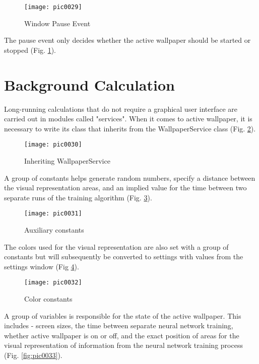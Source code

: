 \begin{figure}[h]
\centering
\texttt{[image: pic0029]}
\caption{Window Pause Event}
\label{fig:pic0029}
\end{figure}
\FloatBarrier

The pause event only decides whether the active wallpaper should be started or stopped (Fig. \ref{fig:pic0029}).

\section{Background Calculation}

Long-running calculations that do not require a graphical user interface are carried out in modules called "services". When it comes to active wallpaper, it is necessary to write its class that inherits from the WallpaperService class (Fig. \ref{fig:pic0030}).

\begin{figure}[h]
\centering
\texttt{[image: pic0030]}
\caption{Inheriting WallpaperService}
\label{fig:pic0030}
\end{figure}
\FloatBarrier

A group of constants helps generate random numbers, specify a distance between the visual representation areas, and an implied value for the time between two separate runs of the training algorithm (Fig. \ref{fig:pic0031}).

\begin{figure}[h]
\centering
\texttt{[image: pic0031]}
\caption{Auxiliary constants}
\label{fig:pic0031}
\end{figure}
\FloatBarrier

The colors used for the visual representation are also set with a group of constants but will subsequently be converted to settings with values from the settings window (Fig \ref{fig:pic0032}).

\begin{figure}[h]
\centering
\texttt{[image: pic0032]}
\caption{Color constants}
\label{fig:pic0032}
\end{figure}
\FloatBarrier

A group of variables is responsible for the state of the active wallpaper. This includes - screen sizes, the time between separate neural network training, whether active wallpaper is on or off, and the exact position of areas for the visual representation of information from the neural network training process (Fig. \ref{fig:pic0033}).

